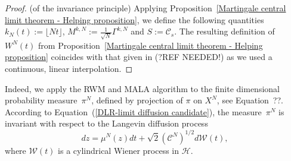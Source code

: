 \begin{proof}(of the invariance principle)
 Applying Proposition~\ref{Martingale central limit theorem - Helping proposition}, we define the following quantities $ k_N(t) := \lfloor Nt \rfloor $, $ M^{k,N} := \frac{1}{\sqrt{N}} \Gamma^{k,N} $ and $ S := \mathcal{C}_s $.  The resulting definition of $ W^{N}(t) $ from Proposition~\ref{Martingale central limit theorem - Helping proposition} coincides with that given in (?REF NEEDED!) as we used a continuous, linear interpolation.
\end{proof}


Indeed, we apply the RWM and MALA algorithm to the finite dimensional probability measure~$\pi^N$, defined by projection of $\pi$ on $X^N$, see Equation~??. According to Equation~(\ref{DLR-limit diffusion candidate}), the measure~$\pi^N$ is invariant with respect to the Langevin diffusion process
\begin{equation}
 \label{DLR- finite dimensional limit diffusion}
 dz = \mu^N (z) dt + \sqrt{2} (\mathcal{C}^N)^{1/2} d\mathcal{W}(t),
\end{equation}
where $\mathcal{W}(t)$ is a cylindrical Wiener process in $\mathcal{H}$.